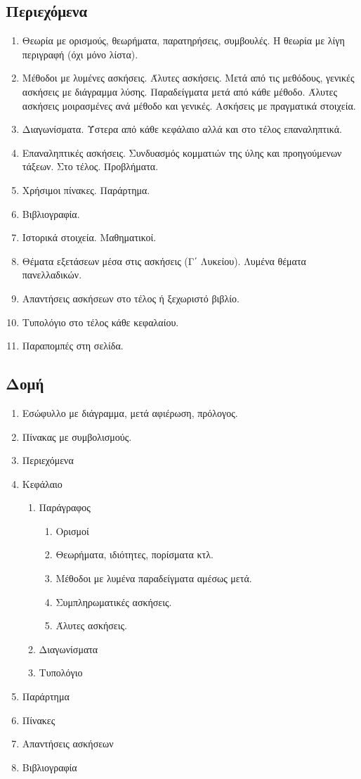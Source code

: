 \documentclass[11pt,a4paper]{book}
\begin{document}
\subsection{Περιεχόμενα}
\begin{enumerate}
\item Θεωρία με ορισμούς, θεωρήματα, παρατηρήσεις, συμβουλές. Η θεωρία με λίγη περιγραφή (όχι μόνο λίστα).
\item Μέθοδοι με λυμένες ασκήσεις. Άλυτες ασκήσεις. Μετά από τις μεθόδους, γενικές ασκήσεις με διάγραμμα λύσης. Παραδείγματα μετά από κάθε μέθοδο. Άλυτες ασκήσεις μοιρασμένες ανά μέθοδο και γενικές. Ασκήσεις με πραγματικά στοιχεία.
\item Διαγωνίσματα. Ύστερα από κάθε κεφάλαιο αλλά και στο τέλος επαναληπτικά. 
\item Επαναληπτικές ασκήσεις. Συνδυασμός κομματιών της ύλης και προηγούμενων τάξεων. Στο τέλος. Προβλήματα.
\item Χρήσιμοι πίνακες. Παράρτημα.
\item Βιβλιογραφία.
\item Ιστορικά στοιχεία. Μαθηματικοί.
\item Θέματα εξετάσεων μέσα στις ασκήσεις (Γ΄ Λυκείου). Λυμένα θέματα πανελλαδικών.
\item Απαντήσεις ασκήσεων στο τέλος ή ξεχωριστό βιβλίο.
\item Τυπολόγιο στο τέλος κάθε κεφαλαίου.
\item Παραπομπές στη σελίδα.
\end{enumerate}
\subsection{Δομή}
\begin{enumerate}
\item Εσώφυλλο με διάγραμμα, μετά αφιέρωση, πρόλογος.
\item Πίνακας με συμβολισμούς.
\item Περιεχόμενα
\item Κεφάλαιο
\begin{enumerate}
\item Παράγραφος
\begin{enumerate}
\item Ορισμοί
\item Θεωρήματα, ιδιότητες, πορίσματα κτλ.
\item Μέθοδοι με λυμένα παραδείγματα αμέσως μετά.
\item Συμπληρωματικές ασκήσεις.
\item Άλυτες ασκήσεις.
\end{enumerate}
\item Διαγωνίσματα
\item Τυπολόγιο
\end{enumerate}
\item Παράρτημα
\item Πίνακες
\item Απαντήσεις ασκήσεων
\item Βιβλιογραφία
\end{enumerate}
\end{document}
